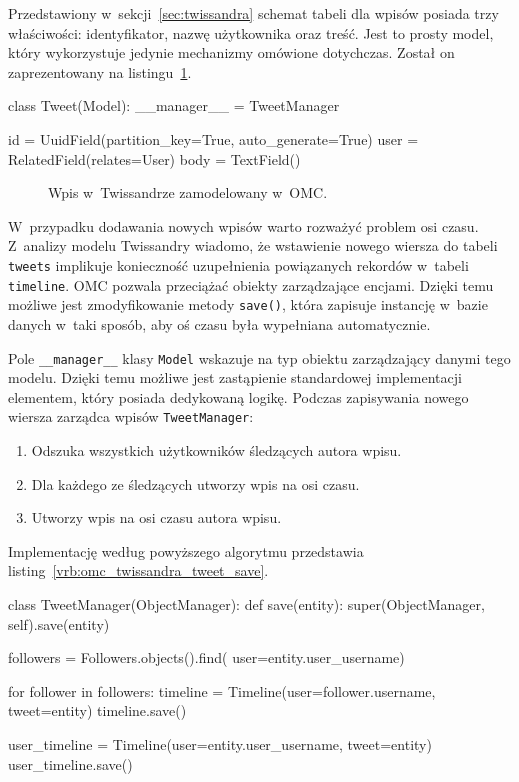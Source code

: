 Przedstawiony w~sekcji~\ref{sec:twissandra} schemat tabeli dla wpisów posiada trzy właściwości: identyfikator, nazwę użytkownika oraz treść. Jest to prosty model, który wykorzystuje jedynie mechanizmy omówione dotychczas. Został on zaprezentowany na listingu~\ref{vrb:omc_twissandra_tweet}.

\begin{verbbox}
	class Tweet(Model):
	    __manager__ = TweetManager

	    id = UuidField(partition_key=True, 
	                   auto_generate=True)
	    user = RelatedField(relates=User)
	    body = TextField()
\end{verbbox}

\begin{figure}[ht!]
	\centering
	\theverbbox
	\caption{Wpis w~Twissandrze zamodelowany w~OMC.}
	\label{vrb:omc_twissandra_tweet}
\end{figure}

W~przypadku dodawania nowych wpisów warto rozważyć problem osi czasu. Z~analizy modelu Twissandry wiadomo, że wstawienie nowego wiersza do tabeli \verb+tweets+ implikuje konieczność uzupełnienia powiązanych rekordów w~tabeli \verb+timeline+. OMC pozwala przeciążać obiekty zarządzające encjami. Dzięki temu możliwe jest zmodyfikowanie metody \verb+save()+, która zapisuje instancję w~bazie danych w~taki sposób, aby oś czasu była wypełniana automatycznie.

Pole \verb+__manager__+ klasy \verb+Model+ wskazuje na typ obiektu zarządzający danymi tego modelu. Dzięki temu możliwe jest zastąpienie standardowej implementacji elementem, który posiada dedykowaną logikę. Podczas zapisywania nowego wiersza zarządca wpisów \verb+TweetManager+:

\begin{enumerate}
	\item Odszuka wszystkich użytkowników śledzących autora wpisu.
	\item Dla każdego ze śledzących utworzy wpis na osi czasu.
	\item Utworzy wpis na osi czasu autora wpisu.
\end{enumerate}

\noindent Implementację według powyższego algorytmu przedstawia listing~\ref{vrb:omc_twissandra_tweet_save}.

\begin{verbbox}
	class TweetManager(ObjectManager):
	    def save(entity):
	        super(ObjectManager, self).save(entity)

	        followers = Followers.objects().find(
	                        user=entity.user_username)

	        for follower in followers:
	            timeline = Timeline(user=follower.username, 
	                                tweet=entity)
	            timeline.save()

	        user_timeline = Timeline(user=entity.user_username, 
	                                 tweet=entity)
	        user_timeline.save()
\end{verbbox}

